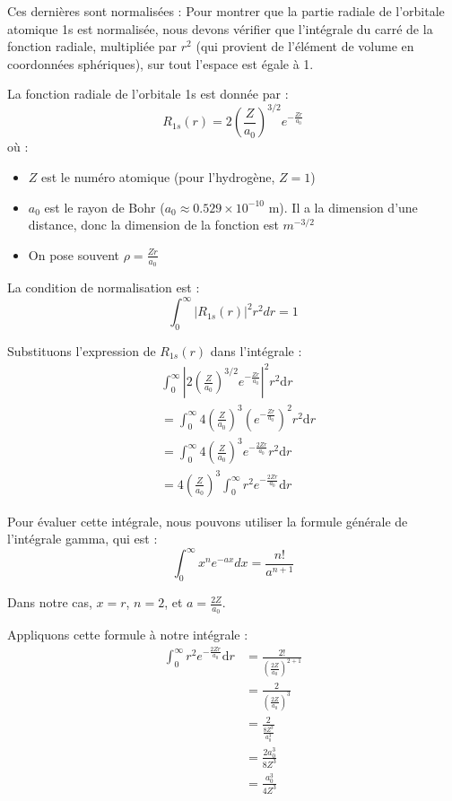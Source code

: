 \documentclass[french]{yLectureNote}
\newcommand{\dd}{\mathrm{d}}
\begin{document}
Ces dernières sont normalisées :
Pour montrer que la partie radiale de l'orbitale atomique 1s est normalisée, nous devons vérifier que l'intégrale du carré de la fonction radiale, multipliée par $r^2$ (qui provient de l'élément de volume en coordonnées sphériques), sur tout l'espace est égale à 1.

La fonction radiale de l'orbitale 1s est donnée par :
\[ R_{1s}(r) = 2 \left(\frac{Z}{a_0}\right)^{3/2} e^{-\frac{Zr}{a_0}} \]
où :
\begin{itemize}
    \item $Z$ est le numéro atomique (pour l'hydrogène, $Z=1$)
    \item $a_0$ est le rayon de Bohr ($a_0 \approx 0.529 \times 10^{-10}$ m). Il a la dimension d'une distance, donc la dimension de la fonction est \(m^{-3/2}\)
    \item On pose souvent \(\rho = \frac{Zr}{a_0}\)
\end{itemize}

La condition de normalisation est :
\[ \int_0^\infty |R_{1s}(r)|^2 r^2 dr = 1 \]

Substituons l'expression de $R_{1s}(r)$ dans l'intégrale :
\begin{align*}
    &\int_0^\infty \left|2 \left(\frac{Z}{a_0}\right)^{3/2} e^{-\frac{Zr}{a_0}}\right|^2 r^2 \dd r \\
    &= \int_0^\infty 4 \left(\frac{Z}{a_0}\right)^3 \left(e^{-\frac{Zr}{a_0}}\right)^2 r^2 \dd r \\
    &= \int_0^\infty 4 \left(\frac{Z}{a_0}\right)^3 e^{-\frac{2Zr}{a_0}} r^2 \dd r\\
    &= 4 \left(\frac{Z}{a_0}\right)^3 \int_0^\infty r^2 e^{-\frac{2Zr}{a_0}} \dd r
\end{align*}

Pour évaluer cette intégrale, nous pouvons utiliser la formule générale de l'intégrale gamma, qui est :
\[ \int_0^\infty x^n e^{-ax} dx = \frac{n!}{a^{n+1}} \]

Dans notre cas, $x = r$, $n = 2$, et $a = \frac{2Z}{a_0}$.

Appliquons cette formule à notre intégrale :
\begin{align*}
    \int_0^\infty r^2 e^{-\frac{2Zr}{a_0}} \dd r &= \frac{2!}{\left(\frac{2Z}{a_0}\right)^{2+1}} \\
    &= \frac{2}{\left(\frac{2Z}{a_0}\right)^3} \\
    &= \frac{2}{\frac{8Z^3}{a_0^3}} \\
    &= \frac{2a_0^3}{8Z^3} \\
    &= \frac{a_0^3}{4Z^3}
\end{align*}
\end{document}

